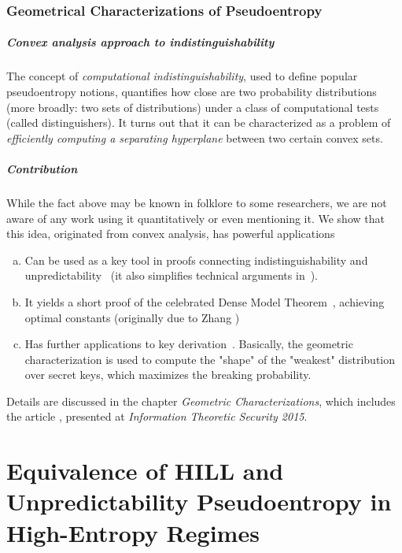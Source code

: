 \documentclass[12pt]{report}
\begin{document}
\subsection{Geometrical Characterizations of Pseudoentropy}

\paragraph{Convex analysis approach to indistinguishability}
The concept of \emph{computational indistinguishability}, used to define popular pseudoentropy notions, quantifies
how close are two probability distributions (more broadly: two sets of distributions) under a class of computational tests (called distinguishers). It turns out that it can be characterized as a problem of 
\emph{efficiently computing a separating hyperplane} between two certain convex sets.

\paragraph{Contribution}
While the fact above may be known in folklore to some researchers, we are not aware of any work using it quantitatively or even mentioning it.
We show that this idea, originated from convex analysis, has powerful applications
\begin{enumerate}[(a)]
\item Can be used as a key tool in proofs connecting indistinguishability and unpredictability~\cite{DBLP:conf/icits/Skorski15,DBLP:conf/icalp/SkorskiGP15}
(it also simplifies technical arguments in~\cite{DBLP:conf/stoc/VadhanZ12}).
\item It yields a short proof of the celebrated Dense Model Theorem~\cite{DBLP:conf/icits/Skorski15}, achieving optimal constants (originally due to Zhang \cite{DBLP:journals/eccc/Zhang11})
\item Has further applications to key derivation~\cite{DBLP:conf/icits/Skorski15,Skorski17a}. Basically, the geometric characterization is used to 
compute the "shape" of the "weakest" distribution over secret keys, which maximizes the breaking probability.
\end{enumerate}
Details are discussed in the chapter \emph{Geometric Characterizations}, which includes the article
\cite{DBLP:conf/icits/Skorski15}, presented at 
\emph{Information Theoretic Security 2015}.


\printbibliography


\chapter{Equivalence of HILL and Unpredictability Pseudoentropy in High-Entropy Regimes}

\end{document}
